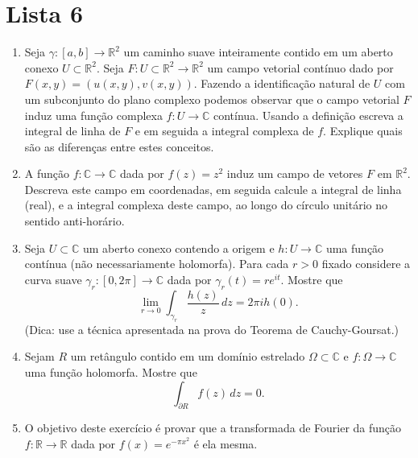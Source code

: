 \chapter*{Lista 6}




\begin{enumerate}[leftmargin=*]


	\item 
	Seja $\gamma:[a,b]\to\mathbb{R}^2$ um caminho suave inteiramente contido em 
	um aberto conexo $U\subset\mathbb{R}^2$. 
	Seja $F:U\subset\mathbb{R}^2\to\mathbb{R}^2$ um campo vetorial contínuo 
	dado por $F(x,y)=(u(x,y),v(x,y))$. Fazendo a identificação natural
	de $U$ com um subconjunto do plano complexo podemos observar que o campo vetorial $F$
	induz uma função complexa $f:U\to\mathbb{C}$ contínua. 
	Usando a definição escreva a integral de linha de $F$ e em seguida 
	a integral complexa de $f$. Explique quais são as diferenças entre
	estes conceitos.  
	
	
	\item A função $f:\mathbb{C}\to\mathbb{C}$ dada por $f(z)=z^2$
	induz um campo de vetores $F$ em $\mathbb{R}^2$. Descreva este campo 
	em coordenadas, em seguida calcule a integral de linha (real),
	e a integral complexa deste campo, ao longo do círculo unitário
	no sentido anti-horário.  

	\item Seja $U\subset \mathbb{C}$ um aberto conexo contendo a origem e 
	$h:U\to\mathbb{C}$ uma função contínua (não necessariamente holomorfa).
	Para cada $r>0$ fixado considere a curva suave 
	$\gamma_r:[0,2\pi]\to\mathbb{C}$ dada por $\gamma_r(t)=re^{it}$. 
	Mostre que 
	\[
	\lim_{r\to 0} \int_{\gamma_r} \frac{h(z)}{z}\, dz  =2\pi i h(0).
	\]
	(Dica: use a técnica apresentada na prova do Teorema de Cauchy-Goursat.)
	
	\item Sejam $R$ um retângulo contido em um domínio estrelado $\Omega\subset\mathbb{C}$ e  
	$f:\Omega\to\mathbb{C}$ uma função holomorfa. Mostre que
	\[
		\int_{\partial R} f(z)\, dz = 0.
	\]  


	
	\item O objetivo deste exercício é provar que a transformada de Fourier da
	função $f:\mathbb{R}\to\mathbb{R}$ dada por $f(x)=e^{-\pi x^2}$
	é ela mesma. 
	

\end{enumerate}
